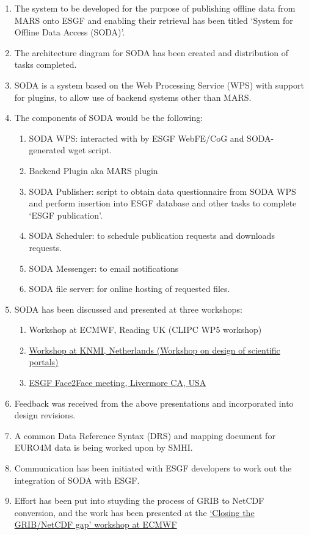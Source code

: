 \documentclass[10pt,one-side,a4paper]{memoir}
\begin{document}
\begin{enumerate}
\item The system to be developed for the purpose of publishing offline data from MARS onto ESGF and enabling their retrieval has been titled `System for Offline Data Access (SODA)'. 
\item The architecture diagram for SODA has been created and distribution of tasks completed. 
\item SODA is a system based on the Web Processing Service (WPS) with support for plugins, to allow use of backend systems other than MARS.  
\item The components of SODA would be the following:
\begin{enumerate}
\item SODA WPS: interacted with by ESGF WebFE/CoG and SODA-generated wget script.
\item Backend Plugin aka MARS plugin
\item SODA Publisher: script to obtain data questionnaire from SODA WPS and perform insertion into ESGF database and other tasks to complete `ESGF publication'.
\item SODA Scheduler: to schedule publication requests and downloads requests.
\item SODA Messenger: to email notifications
\item SODA file server: for online hosting of requested files.
\end{enumerate}

\item SODA has been discussed and presented at three workshops:
\begin{enumerate}
\item Workshop at ECMWF, Reading UK (CLIPC WP5 workshop)
\item \href{http://www.clipc.eu/portal-design-workshop/content=0055_000000}{Workshop at KNMI, Netherlands (Workshop on design of scientific portals)}
\item \href{http://esgf.llnl.gov/facetoface.html}{ESGF Face2Face meeting, Livermore CA, USA}
\end{enumerate}
\item Feedback was received from the above presentations and incorporated into design revisions.
\item A common Data Reference Syntax (DRS) and mapping document for EURO4M data is being worked upon by SMHI.
\item Communication has been initiated with ESGF developers to work out the integration of SODA with ESGF.
\item Effort has been put into stuyding the process of GRIB to NetCDF conversion, and the work has been presented at the \href{http://www.clipc.eu/portal-design-workshop/content=0055_000000}{`Closing the GRIB/NetCDF gap' workshop at ECMWF}
\end{enumerate}
\end{document}
